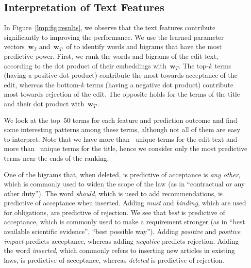 \subsection{Interpretation of Text Features}
\label{lmp:sec:intertext}

In Figure~\ref{lmp:fig:results}, we observe that the text features contribute significantly to improving the performance.
We use the learned parameter vectors~$\boldsymbol{w}_T$ and~$\boldsymbol{w}_{T'}$ of  to identify words and bigrams that have the most predictive power.
First, we rank the words and bigrams of the edit text, according to the dot product of their embeddings with~$\boldsymbol{w}_T$.
The top-$k$ terms (having a positive dot product) contribute the most towards acceptance of the edit, whereas the bottom-$k$ terms (having a negative dot product) contribute most towards rejection of the edit.
The opposite holds for the terms of the title and their dot product with~$\boldsymbol{w}_{T'}$.

We look at the top~$50$ terms for each feature and prediction outcome and find some interesting patterns among these terms, although not all of them are easy to interpret.
Note that we have more than~ unique terms for the edit text and more than~ unique terms for the title, hence we consider only the most predictive terms near the ends of the ranking.

One of the bigrams that, when deleted, is predictive of acceptance is \textit{any other}, which is commonly used to widen the scope of the law (as in ``contractual or any other duty'').
The word \textit{should}, which is used to add recommendations, is predictive of acceptance when inserted.
Adding \textit{must} and \textit{binding}, which are used for obligations, are predictive of rejection.
We see that \textit{best} is predictive of acceptance, which is commonly used to make a requirement stronger (as in ``best available scientific evidence'', ``best possible way'').
Adding \textit{positive} and \textit{positive impact} predicts acceptance, whereas adding \textit{negative} predicts rejection.
Adding the word \textit{inserted}, which commonly refers to inserting new articles in existing laws, is predictive of acceptance, whereas \textit{deleted} is predictive of rejection.

